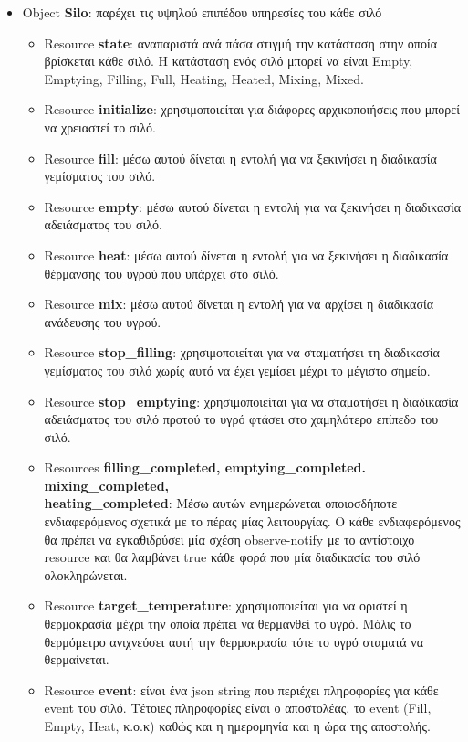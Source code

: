 \begin{itemize}
	\item{Object \textbf{Silo}: παρέχει τις υψηλού επιπέδου υπηρεσίες του κάθε 
	σιλό
	\begin{itemize}
		\item{Resource \textbf{state}: αναπαριστά ανά πάσα στιγμή την κατάσταση στην οποία βρίσκεται κάθε σιλό. Η κατάσταση ενός σιλό μπορεί να είναι {Empty, Emptying, Filling, Full, Heating, Heated, Mixing, Mixed}. }
		\item{Resource \textbf{initialize}: χρησιμοποιείται για διάφορες αρχικοποιήσεις που μπορεί να χρειαστεί το σιλό.}
		\item{Resource \textbf{fill}: μέσω αυτού δίνεται η εντολή για να ξεκινήσει η διαδικασία γεμίσματος του σιλό.}
		\item{Resource \textbf{empty}: μέσω αυτού δίνεται η εντολή για να ξεκινήσει η διαδικασία αδειάσματος του σιλό.}
		\item{Resource \textbf{heat}: μέσω αυτού δίνεται η εντολή για να ξεκινήσει η διαδικασία θέρμανσης του υγρού που υπάρχει στο σιλό. }
		\item{Resource \textbf{mix}: μέσω αυτού δίνεται η εντολή για να αρχίσει η διαδικασία ανάδευσης του υγρού. }
		\item{Resource \textbf{stop\_filling}: χρησιμοποιείται για να σταματήσει τη διαδικασία γεμίσματος του σιλό χωρίς αυτό να έχει γεμίσει μέχρι το μέγιστο σημείο.}
		\item{Resource \textbf{stop\_emptying}: χρησιμοποιείται για να σταματήσει η διαδικασία αδειάσματος του σιλό προτού το υγρό φτάσει στο χαμηλότερο επίπεδο του σιλό. }
		\item{Resources \textbf{filling\_completed, emptying\_completed. mixing\_completed, \\heating\_completed}: Μέσω αυτών ενημερώνεται οποιοσδήποτε ενδιαφερόμενος σχετικά με το πέρας μίας λειτουργίας. Ο κάθε ενδιαφερόμενος θα πρέπει να εγκαθιδρύσει μία σχέση observe-notify με το αντίστοιχο resource και θα λαμβάνει true κάθε φορά που μία διαδικασία του σιλό ολοκληρώνεται.}
		\item{Resource \textbf{target\_temperature}: χρησιμοποιείται για να οριστεί η θερμοκρασία μέχρι την οποία πρέπει να θερμανθεί το υγρό. Μόλις το θερμόμετρο ανιχνεύσει αυτή την θερμοκρασία τότε το υγρό σταματά να θερμαίνεται.}
		\item{Resource \textbf{event}: είναι ένα json string που περιέχει πληροφορίες για κάθε event του σιλό. Τέτοιες πληροφορίες είναι ο αποστολέας, το event (Fill, Empty, Heat, κ.ο.κ) καθώς και η ημερομηνία και η ώρα της αποστολής.}

\end{itemize}}
\end{itemize}
